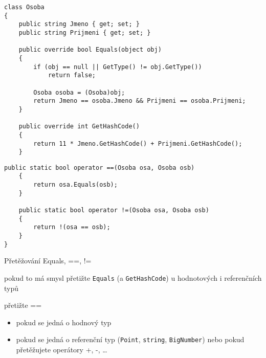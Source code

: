 \begin{frame}[fragile]
\begin{bonusblock}{}
\begin{lstlisting}[basicstyle=\small]
class Osoba
{
	public string Jmeno { get; set; }
	public string Prijmeni { get; set; }
	
	public override bool Equals(object obj)
	{
	    if (obj == null || GetType() != obj.GetType())
	        return false;
	
	    Osoba osoba = (Osoba)obj;
	    return Jmeno == osoba.Jmeno && Prijmeni == osoba.Prijmeni;
	}
	
	public override int GetHashCode()
	{
		return 11 * Jmeno.GetHashCode() + Prijmeni.GetHashCode();
	}
\end{lstlisting}
\end{bonusblock}
\end{frame}


\begin{frame}[fragile]
\begin{bonusblock}{}
\begin{lstlisting}[basicstyle=\small]
	public static bool operator ==(Osoba osa, Osoba osb)
	{
	    return osa.Equals(osb);
	}
	
	public static bool operator !=(Osoba osa, Osoba osb)
	{
	    return !(osa == osb);
	}
}
\end{lstlisting}
\end{bonusblock}
\vskip -3mm
\begin{bitemize}{Přetěžování Equals, ==, !=}
\item pokud to má smysl přetižte \lstinline|Equals| (a \lstinline|GetHashCode|) u hodnotových i referenčních typů
\item přetižte ==
\begin{itemize}
\item pokud se jedná o hodnový typ
\item pokud se jedná o referenční  typ (\lstinline|Point|, \lstinline|string|, \lstinline|BigNumber|) nebo pokud přetěžujete operátory +, -, \ldots
\end{itemize}
\end{bitemize}
\end{frame}







